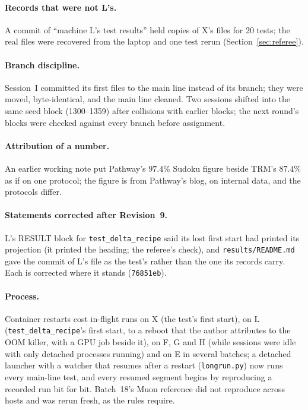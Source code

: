 \documentclass[11pt]{article}
\begin{document}
\paragraph{Records that were not L's.} A commit of ``machine L's test results'' held copies of X's files for 20 tests; the real files were recovered from the laptop and one test rerun (Section~\ref{sec:referee}).

\paragraph{Branch discipline.} Session~I committed its first files to the main line instead of its branch; they were moved, byte-identical, and the main line cleaned. Two sessions shifted into the same seed block (1300--1359) after collisions with earlier blocks; the next round's blocks were checked against every branch before assignment.

\paragraph{Attribution of a number.} An earlier working note put Pathway's $97.4\%$ Sudoku figure beside TRM's $87.4\%$ as if on one protocol; the figure is from Pathway's blog, on internal data, and the protocols differ.

\paragraph{Statements corrected after Revision~9.} L's RESULT block for \texttt{test\_delta\_recipe} said its lost first start had printed its projection (it printed the heading; the referee's check), and \texttt{results/README.md} gave the commit of L's file as the test's rather than the one its records carry. Each is corrected where it stands (\texttt{76851eb}).

\paragraph{Process.} Container restarts cost in-flight runs on X (the test's first start), on L (\texttt{test\_delta\_recipe}'s first start, to a reboot that the author attributes to the OOM killer, with a GPU job beside it), on F, G and H (while sessions were idle with only detached processes running) and on E in several batches; a detached launcher with a watcher that resumes after a restart (\texttt{longrun.py}) now runs every main-line test, and every resumed segment begins by reproducing a recorded run bit for bit. Batch~18's Muon reference did not reproduce across hosts and was rerun fresh, as the rules require.
\end{document}

